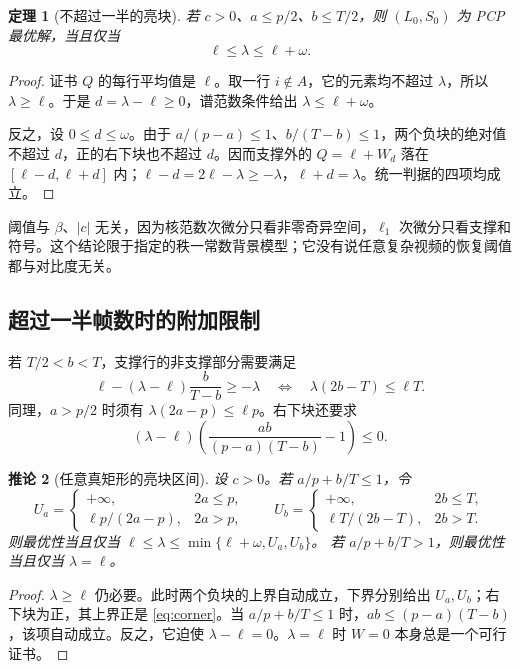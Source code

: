 \documentclass[UTF8,fontset=none,zihao=-4,a4paper]{ctexart}
\theoremstyle{plainzh}
\newtheorem{theorem}{定理}[section]
\newtheorem{corollary}[theorem]{推论}
\numberwithin{equation}{section}
\begin{document}
\begin{theorem}[不超过一半的亮块]\label{thm:bright}
若 $c>0$、$a\le p/2$、$b\le T/2$，则 $(L_0,S_0)$ 为 PCP 最优解，当且仅当
\begin{equation}\label{eq:bright}
 \boxed{\quad\ell\le\lambda\le\ell+\omega.\quad}
\end{equation}
\end{theorem}
\begin{proof}
证书 $Q$ 的每行平均值是 $\ell$。取一行 $i\notin A$，它的元素均不超过 $\lambda$，所以 $\lambda\ge\ell$。于是 $d=\lambda-\ell\ge0$，谱范数条件给出 $\lambda\le\ell+\omega$。

反之，设 $0\le d\le\omega$。由于 $a/(p-a)\le1$、$b/(T-b)\le1$，两个负块的绝对值不超过 $d$，正的右下块也不超过 $d$。因而支撑外的 $Q=\ell+W_d$ 落在 $[\ell-d,\ell+d]$ 内；$\ell-d=2\ell-\lambda\ge-\lambda$，$\ell+d=\lambda$。统一判据的四项均成立。
\end{proof}

阈值与 $\beta$、$|c|$ 无关，因为核范数次微分只看非零奇异空间，$\ell_1$ 次微分只看支撑和符号。这个结论限于指定的秩一常数背景模型；它没有说任意复杂视频的恢复阈值都与对比度无关。

\subsection{超过一半帧数时的附加限制}

若 $T/2<b<T$，支撑行的非支撑部分需要满足
\[
 \ell-(\lambda-\ell)\frac{b}{T-b}\ge-\lambda
 \quad\Longleftrightarrow\quad
 \lambda(2b-T)\le\ell T.
\]
同理，$a>p/2$ 时须有 $\lambda(2a-p)\le\ell p$。右下块还要求
\begin{equation}\label{eq:corner}
 (\lambda-\ell)\left(\frac{ab}{(p-a)(T-b)}-1\right)\le0.
\end{equation}

\begin{corollary}[任意真矩形的亮块区间]\label{cor:generalbright}
设 $c>0$。若 $a/p+b/T\le1$，令
\[
 U_a=\begin{cases}+\infty,&2a\le p,\\ \ell p/(2a-p),&2a>p,\end{cases}
 \qquad
 U_b=\begin{cases}+\infty,&2b\le T,\\ \ell T/(2b-T),&2b>T.\end{cases}
\]
则最优性当且仅当 $\ell\le\lambda\le\min\{\ell+\omega,U_a,U_b\}$。
若 $a/p+b/T>1$，则最优性当且仅当 $\lambda=\ell$。
\end{corollary}
\begin{proof}
$\lambda\ge\ell$ 仍必要。此时两个负块的上界自动成立，下界分别给出 $U_a,U_b$；右下块为正，其上界正是 \eqref{eq:corner}。当 $a/p+b/T\le1$ 时，$ab\le(p-a)(T-b)$，该项自动成立。反之，它迫使 $\lambda-\ell=0$。$\lambda=\ell$ 时 $W=0$ 本身总是一个可行证书。
\end{proof}
\end{document}
